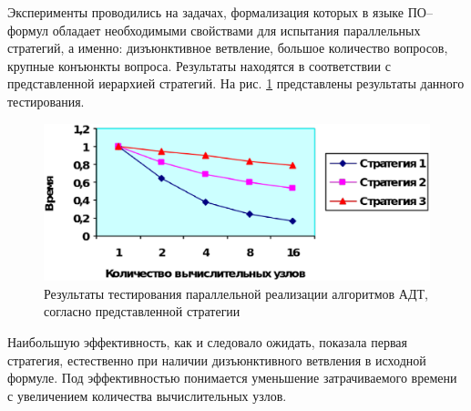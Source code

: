 Эксперименты проводились на задачах, формализация которых в языке ПО--формул обладает необходимыми свойствами для испытания параллельных стратегий, а именно: дизъюнктивное ветвление, большое количество вопросов, крупные конъюнкты вопроса. Результаты находятся в соответствии с представленной иерархией стратегий. На рис. \ref{fig:parallel} представлены результаты данного тестирования.
\begin{figure}[h]
	\centering
	\includegraphics[width=0.7\linewidth]{pics/Parallel.eps}
	\caption{Результаты тестирования параллельной реализации алгоритмов АДТ, согласно представленной стратегии}
	\label{fig:parallel}
\end{figure}

Наибольшую эффективность, как и следовало ожидать, показала первая стратегия, естественно при наличии дизъюнктивного ветвления в исходной формуле. Под эффективностью понимается уменьшение затрачиваемого времени с увеличением количества вычислительных узлов.



